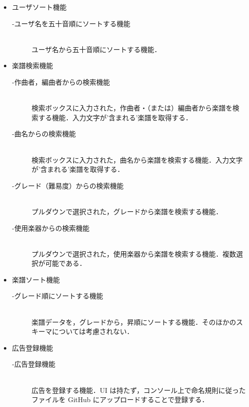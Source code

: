 \begin{itemize}
    \item ユーザソート機能
          \begin{description}
              \item[-ユーザ名を五十音順にソートする機能] \mbox{}\\
                  ユーザ名から五十音順にソートする機能．
          \end{description}
    \item 楽譜検索機能
          \begin{description}
              \item[-作曲者，編曲者からの検索機能]\mbox{}\\
              検索ボックスに入力された，作曲者・（または）編曲者から楽譜を検索する機能．入力文字が'含まれる'楽譜を取得する．
              \item[-曲名からの検索機能] \mbox{}\\
                  検索ボックスに入力された，曲名から楽譜を検索する機能．入力文字が'含まれる'楽譜を取得する．
              \item[-グレード（難易度）からの検索機能] \mbox{}\\
                  プルダウンで選択された，グレードから楽譜を検索する機能．
              \item[-使用楽器からの検索機能] \mbox{}\\
                  プルダウンで選択された，使用楽器から楽譜を検索する機能．複数選択が可能である．
          \end{description}
    \item 楽譜ソート機能
          \begin{description}
              \item[-グレード順にソートする機能] \mbox{}\\
                  楽譜データを，グレードから，昇順にソートする機能．そのほかのスキーマについては考慮されない．
          \end{description}
    \item 広告登録機能
          \begin{description}
              \item[-広告登録機能]\mbox{}\\
              広告を登録する機能．UI は持たず，コンソール上で命名規則に従ったファイルを
              GitHub にアップロードすることで登録する．
          \end{description}
\end{itemize}
